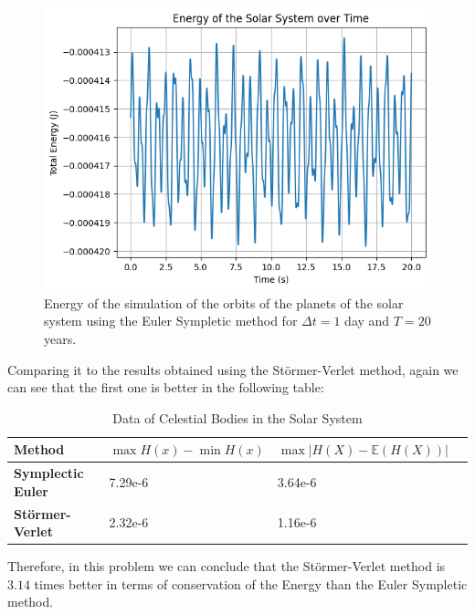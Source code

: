 \documentclass{article}
\begin{document}
\begin{figure}[H]
	\centering
	\includegraphics[width=0.5\linewidth]{./Figures/SolarSystem/energy_euler.png}
	\caption{Energy of the simulation of the orbits of the planets of the solar system using the Euler Sympletic method for \(\Delta t = 1\) day and \(T = 20\) years.}
	\label{fig:solarsystemenergyeuler}
\end{figure}

Comparing it to the results obtained using the Störmer-Verlet method, again we can see that the first one is better in the following table:

\begin{table}[H]
	\centering
	\renewcommand{\arraystretch}{1.2} %
	\begin{tabular}{>{\bfseries}l >{\raggedleft}p{4cm} >{\raggedleft\arraybackslash}p{4cm} >{\raggedleft\arraybackslash}p{3cm}}
	\toprule
	\textbf{Method} & $\max{H(x)} - \min{H(x)}$  & $\max{|H(X) - \mathbb{E}(H(X))|}$\\
	\midrule
	Symplectic Euler & 7.29e-6 & 3.64e-6  \\
	Störmer-Verlet   & 2.32e-6 & 1.16e-6 \\
	\bottomrule
	\end{tabular}
	\caption{Data of Celestial Bodies in the Solar System}
	\label{table:comparison}
\end{table}

Therefore, in this problem we can conclude that the Störmer-Verlet method is $3.14$ times better in terms of conservation of the Energy than the Euler Sympletic method.



\end{document}
